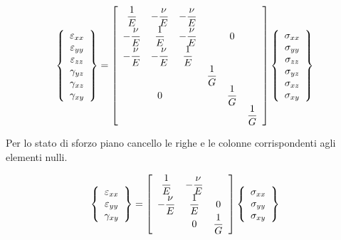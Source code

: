  \begin{equation*}
\left\{
\begin{array}{c}
\varepsilon_{xx} \\
\varepsilon_{yy} \\
\varepsilon_{zz} \\
\gamma_{yz} \\
\gamma_{xz} \\
\gamma_{xy}
\end{array}
\right\}
=
\left[
\begin{array}{cccccc}
\displaystyle \frac{1}{E} & \displaystyle -\frac{\nu}{E} & \displaystyle -\frac{\nu}{E} & & & \\
\displaystyle -\frac{\nu}{E} & \displaystyle \frac{1}{E} & \displaystyle -\frac{\nu}{E} & & \large{0} & \\
\displaystyle -\frac{\nu}{E} & \displaystyle -\frac{\nu}{E} & \displaystyle \frac{1}{E} & & & \\
& & & \displaystyle \frac{1}{G} & & \\
& \large{0} & & & \displaystyle \frac{1}{G} & \\
& & & & & \displaystyle \frac{1}{G}
\end{array}
\right]
\left\{
\begin{array}{c}
\sigma_{xx} \\
\sigma_{yy} \\
\sigma_{zz} \\
\sigma_{yz} \\
\sigma_{xz} \\
\sigma_{xy}
\end{array}
\right\}
\end{equation*}

Per lo stato di sforzo piano cancello le righe e le colonne corrispondenti agli elementi nulli.

\begin{equation*}
\left\{
\begin{array}{c}
\varepsilon_{xx} \\
\varepsilon_{yy} \\
\gamma_{xy}
\end{array}
\right\}
=
\left[
\begin{array}{ccc}
\displaystyle \frac{1}{E} & \displaystyle -\frac{\nu}{E} & \\
\displaystyle -\frac{\nu}{E} & \displaystyle \frac{1}{E} & \large{0} \\
& \large{0} & \displaystyle \frac{1}{G}
\end{array}
\right]
\left\{
\begin{array}{c}
\sigma_{xx} \\
\sigma_{yy} \\
\sigma_{xy}
\end{array}
\right\}
\end{equation*}

